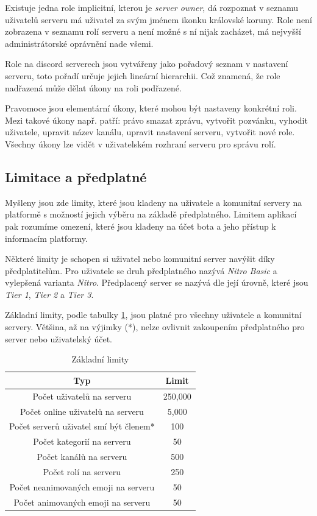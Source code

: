 \documentclass[
  program=inf,
biblatex=false,
sourcecodes=true,
joinlists=true,
  figures=true,
  tables=true,
  glossaries=true,
  index=false
]{kidiplom}
\begin{document}
Existuje jedna role implicitní, kterou je {\it server owner}, dá rozpoznat v 
seznamu uživatelů serveru má uživatel za svým jménem ikonku královské koruny. Role není zobrazena
v seznamu rolí serveru a není možné s ní nijak zacházet, má nejvyšší administrátorské
oprávnění nade všemi.

Role na discord serverech jsou vytvářeny jako pořadový seznam v nastavení serveru,
toto pořadí určuje jejich lineární hierarchii. Což znamená, že role nadřazená může
dělat úkony na roli podřazené.

Pravomoce jsou elementární úkony, které mohou být nastaveny konkrétní roli. Mezi takové
úkony např. patří: právo smazat zprávu, vytvořit pozvánku, vyhodit uživatele, upravit název kanálu, 
upravit nastavení serveru, vytvořit nové role.
Všechny úkony lze vidět v uživatelském rozhraní serveru pro správu rolí.

\subsection{Limitace a předplatné}
Myšleny jsou zde limity, které jsou kladeny na uživatele a komunitní servery
na platformě s možností jejich výběru na základě předplatného. Limitem aplikací pak
rozumíme omezení, které jsou kladeny na účet bota a jeho přístup k informacím platformy.

Některé limity je schopen si uživatel nebo komunitní server navýšit
díky předplatitelům. Pro uživatele se druh předplatného nazývá {\it Nitro Basic} a vylepšená
varianta {\it Nitro}. Předplacený server se nazývá dle její úrovně, které jsou 
{\it Tier 1}, {\it Tier 2} a {\it Tier 3}.

Základní limity, podle tabulky \ref{unpaid}, jsou platné pro 
všechny uživatele a komunitní servery. Většina, až na výjimky (*), nelze ovlivnit zakoupením
předplatného pro server nebo uživatelský účet.

\begin{table}[h]
  \begin{center}
    \begin{tabular}{|c|c|}
      \hline
      Typ & Limit \\
      \hline
      Počet uživatelů na serveru & 250,000 \\
      Počet online uživatelů na serveru & 5,000 \\
      Počet serverů uživatel smí být členem* & 100 \\
      Počet kategorií na serveru & 50 \\
      Počet kanálů na serveru & 500 \\
      Počet rolí na serveru & 250 \\
      Počet neanimovaných emoji na serveru & 50 \\
      Počet animovaných emoji na serveru & 50 \\
      \hline
    \end{tabular}
  \end{center}
  \caption{\label{unpaid}Základní limity}
\end{table}
\end{document}
